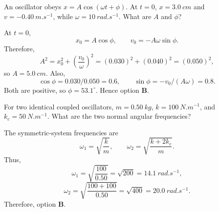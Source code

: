 \begin{quizquestion}[
  id=phy104-osc-021,
  topic=oscillations,
  difficulty=applied,
  marks=2,
  correct=B,
  tags={shm,initial-conditions,phase-constant},
  outcome={Determine amplitude and phase from initial conditions}
]
  An oscillator obeys \(x=A\cos(\omega t+\phi)\). At \(t=0\), \(x=\SI{3.0}{cm}\) and \(v=\SI{-0.40}{m.s^{-1}}\), while \(\omega=\SI{10}{rad.s^{-1}}\). What are \(A\) and \(\phi\)?
\end{quizquestion}
\begin{quizsolution}
  At \(t=0\),
  \[
    x_0=A\cos\phi,\qquad v_0=-A\omega\sin\phi.
  \]
  Therefore,
  \[
    A^2=x_0^2+{\left(\frac{v_0}{\omega}\right)}^2
    ={(0.030)}^2+{(0.040)}^2={(0.050)}^2,
  \]
  so \(A=\SI{5.0}{cm}\). Also,
  \[
    \cos\phi=0.030/0.050=0.6,
    \qquad
    \sin\phi=-v_0/(A\omega)=0.8.
  \]
  Both are positive, so \(\phi=53.1^\circ\). Hence option \textbf{B}.
\end{quizsolution}

\begin{quizquestion}[
  id=phy104-nm-026,
  topic=normal-modes,
  difficulty=applied,
  marks=2,
  correct=B,
  tags={coupled-oscillators,normal-frequency,eigenfrequencies},
  outcome={Calculate the normal frequencies of a symmetric coupled system}
]
  For two identical coupled oscillators, \(m=\SI{0.50}{kg}\), \(k=\SI{100}{N.m^{-1}}\), and \(k_c=\SI{50}{N.m^{-1}}\). What are the two normal angular frequencies?
\end{quizquestion}
\begin{quizsolution}
  The symmetric-system frequencies are
  \[
    \omega_1=\sqrt{\frac{k}{m}},\qquad
    \omega_2=\sqrt{\frac{k+2k_c}{m}}.
  \]
  Thus,
  \[
    \omega_1=\sqrt{\frac{100}{0.50}}=\sqrt{200}=\SI{14.1}{rad.s^{-1}},
  \]
  \[
    \omega_2=\sqrt{\frac{100+100}{0.50}}=\sqrt{400}=\SI{20.0}{rad.s^{-1}}.
  \]
  Therefore, option \textbf{B}.
\end{quizsolution}


